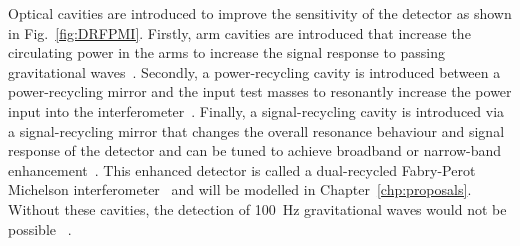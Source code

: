 Optical cavities are introduced to improve the sensitivity of the detector as shown in Fig.~\ref{fig:DRFPMI}. %
Firstly, arm cavities are introduced that increase the circulating power in the arms to increase the signal response to passing gravitational waves~\cite{}.
Secondly, a power-recycling cavity is introduced between a power-recycling mirror and the input test masses  to resonantly  increase the power input into the interferometer~\cite{meersRecyclingLaserinterferometricGravitationalwave1988,}.
Finally, a signal-recycling cavity is introduced via a signal-recycling mirror that changes the overall resonance behaviour and signal response of the detector and can be tuned to achieve broadband or narrow-band enhancement~\cite{meersRecyclingLaserinterferometricGravitationalwave1988,1995AuJPh..48..953M}.
This enhanced detector is called a dual-recycled Fabry-Perot Michelson interferometer~\cite{meersRecyclingLaserinterferometricGravitationalwave1988} and will be modelled in Chapter~\ref{chp:proposals}. Without these cavities, the detection of 100~Hz gravitational waves would not be possible~\cite{} . %



